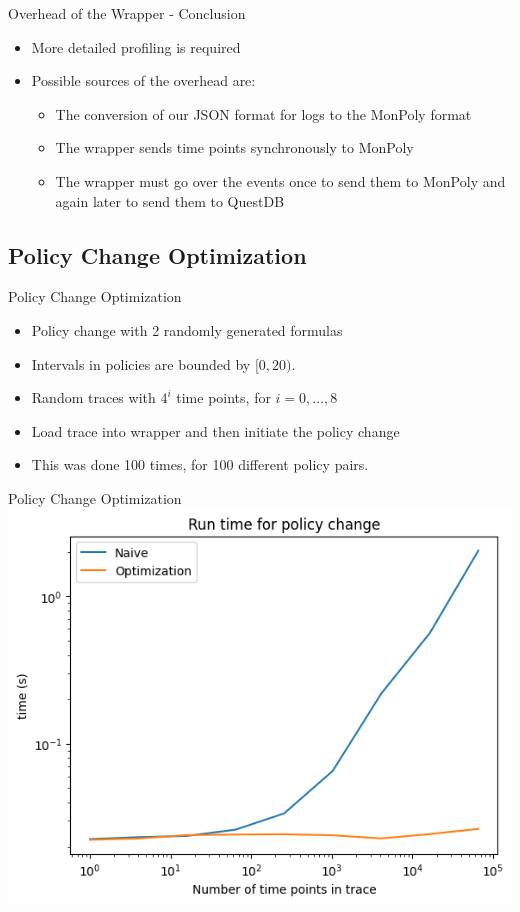 \begin{frame}{Overhead of the Wrapper - Conclusion}
    \begin{itemize}
        \item More detailed profiling is required
        \item Possible sources of the overhead are:
        \begin{itemize}
            \item The conversion of our JSON format for logs to the MonPoly format
            \item The wrapper sends time points synchronously to MonPoly
            \item The wrapper must go over the events once to send them to MonPoly and again later to send them to QuestDB
        \end{itemize}
    \end{itemize}
    
\end{frame}


\subsection{Policy Change Optimization}
\begin{frame}{Policy Change Optimization}
    \begin{itemize}
        \item Policy change with 2 randomly generated formulas
        \item Intervals in policies are bounded by $[0,20)$.
        \item Random traces with $4^i$ time points, for $i = 0,\dots, 8$
        \item Load trace into wrapper and then initiate the policy change
        \item This was done 100 times, for 100 different policy pairs.
    \end{itemize}
\end{frame}

    
\begin{frame}{Policy Change Optimization}
    \centering
    \includegraphics[width=0.9\linewidth]{diagrams/policy-change-log-log.png}
\end{frame}